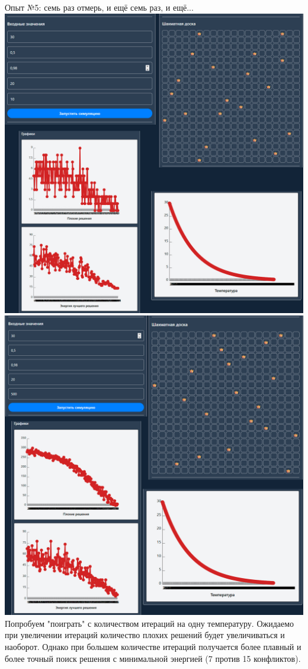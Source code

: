 \documentclass[a4paper,14pt]{extarticle}
\begin{document}
Опыт №5: семь раз отмерь, и ещё семь раз, и ещё...\\
\includegraphics[width=140mm]{report51}\\
\includegraphics[width=140mm]{report52}\\
Попробуем "поиграть" с количеством итераций на одну температуру. Ожидаемо при увеличении итераций количество 
плохих решений будет увеличиваться и наоборот. Однако при большем количестве итераций получается более плавный 
и более точный поиск решения с минимальной энергией (7 против 15 конфликтов).\bigbreak
\end{document}
